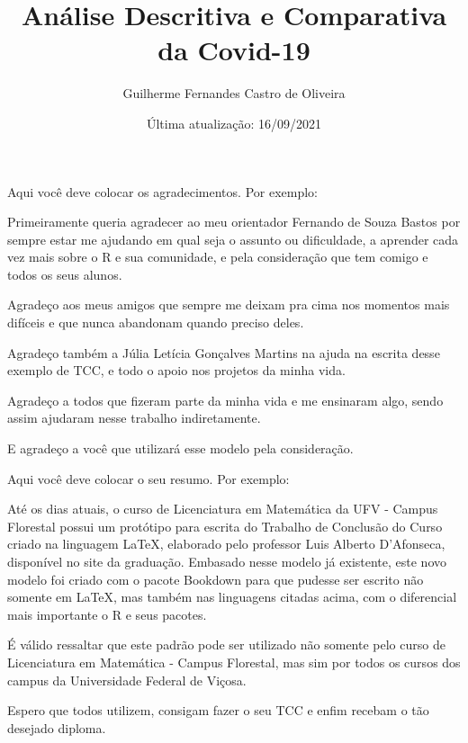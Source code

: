 \documentclass[
  fleqn,ebook]{ic}
\title{Análise Descritiva e Comparativa da Covid-19}
\author{Guilherme Fernandes Castro de Oliveira}
\date{Última atualização: 16/09/2021}
\renewcommand\maketitle{}
\begin{document}
\maketitle

\begin{acknowledgement}

  Aqui você deve colocar os agradecimentos. Por exemplo:
  
  Primeiramente queria agradecer ao meu orientador Fernando de Souza Bastos por
  sempre estar me ajudando em qual seja o assunto ou dificuldade, a aprender
  cada vez mais sobre o R e sua comunidade, e pela consideração que tem comigo e
  todos os seus alunos.
  
  Agradeço aos meus amigos que sempre me deixam pra cima nos momentos mais
  difíceis e que nunca abandonam quando preciso deles.

  Agradeço também a Júlia Letícia Gonçalves Martins na ajuda na escrita desse
  exemplo de TCC, e todo o apoio nos projetos da minha vida.
  
  Agradeço a todos que fizeram parte da minha vida e me ensinaram algo, sendo
  assim ajudaram nesse trabalho indiretamente.
  
  E agradeço a você que utilizará esse modelo pela consideração.

\end{acknowledgement}
\begin{Resumo}
  
  Aqui você deve colocar o seu resumo. Por exemplo:
  
  Até os dias atuais, o curso de Licenciatura em Matemática da UFV - Campus 
  Florestal possui um protótipo para escrita do Trabalho de Conclusão do Curso
  criado na linguagem LaTeX, elaborado pelo professor Luis Alberto D'Afonseca, 
  disponível no site da graduação. Embasado nesse modelo já existente, este novo
  modelo foi criado com o pacote Bookdown para que pudesse ser escrito não 
  somente em LaTeX, mas também nas linguagens citadas acima, com o diferencial 
  mais importante o R e seus pacotes.
  
  É válido ressaltar que este padrão pode ser utilizado não somente pelo curso
  de Licenciatura em Matemática - Campus Florestal, mas sim por todos os cursos
  dos campus da Universidade Federal de Viçosa.
  
  Espero que todos utilizem, consigam fazer o seu TCC e enfim recebam o tão
  desejado diploma.
  
\end{Resumo}
\end{document}
